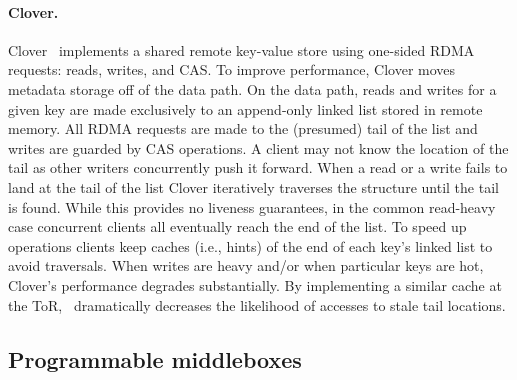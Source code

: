 
\paragraph{Clover.}

Clover~\cite{clover} implements a shared remote key-value store using
one-sided RDMA requests: reads, writes, and CAS.  To improve
performance, Clover moves metadata storage off of the data path. On
the data path, reads and writes for a given key are made exclusively
to an append-only linked list stored in remote memory. All RDMA
requests are made to the (presumed) tail of the list and writes are
guarded by CAS operations. A client may not know the location of the
tail as other writers concurrently push it forward. When a read or a
write fails to land at the tail of the list Clover iteratively
traverses the structure until the tail is found. While this provides
no liveness guarantees, in the common read-heavy case concurrent
clients all eventually reach the end of the list. To speed up
operations clients keep caches (i.e., hints) of the end of each key's
linked list to avoid traversals. When writes are heavy and/or when
particular keys are hot, Clover's performance degrades substantially.
By implementing a similar cache at the ToR, \sword\ dramatically
decreases the likelihood of accesses to stale tail locations.



\subsection{Programmable middleboxes}

